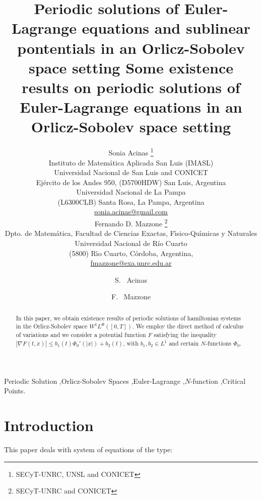 \documentclass[twoside]{elsarticle}
\title{Periodic solutions of 
Euler-Lagrange equations and sublinear pontentials   in an Orlicz-Sobolev space setting }
\author{Sonia Acinas \thanks{SECyT-UNRC, UNSL and CONICET}\\
Instituto de Matem\'atica Aplicada San Luis (IMASL)\\ 
Universidad Nacional de San Luis and CONICET\\
Ej\'ercito de los Andes 950,
(D5700HDW) San Luis, Argentina\\
Universidad Nacional de La Pampa\\
(L6300CLB) Santa Rosa, La Pampa, Argentina\\
\url{sonia.acinas@gmail.com}\\[3mm]
Fernando D. Mazzone \thanks{SECyT-UNRC and CONICET}\\
Dpto. de Matem\'atica, Facultad de Ciencias Exactas, F\'{\i}sico-Qu\'{\i}micas y Naturales\\
Universidad Nacional de R\'{i}o Cuarto\\
(5800) R\'{\i}o Cuarto, C\'ordoba, Argentina,\\
\url{fmazzone@exa.unrc.edu.ar}
}
\date{}
\theoremstyle{remark}
\newcommand{\lphi}{L^{\Phi}}
\newcommand{\wphi}{W^{1}\lphi}
\renewcommand{\leq}{\leqslant}
\begin{document}
\begin{frontmatter}
\title{Some existence results on periodic solutions of 
Euler-Lagrange equations in an Orlicz-Sobolev space setting}



\author[imasl,unlpam]{S. ~Acinas }
\author[unrc,unlpam]{F. ~Mazzone }


\address[imasl]{Instituto de Matem\'atica Aplicada San Luis (CONICET-UNSL),\\
(5700) San Luis, Argentina.  }

\address[unlpam]{Universidad Nacional de La Pampa,
(6300) Santa Rosa, La Pampa, Argentina.  }

\address[unrc]{Dpto. de Matem\'atica, Facultad de Ciencias Exactas, F\'{\i}sico-Qu\'{\i}micas y Naturales,
Universidad Nacional de R\'{i}o Cuarto,
(5800) R\'{\i}o Cuarto, C\'ordoba, Argentina. }




\begin{abstract}




In this paper, we obtain existence results of periodic solutions of hamiltonian systems in the Orlicz-Sobolev space $\wphi([0,T])$.
We employ the direct method of calculus of variations and we consider  a potential  function $F$ satisfying the inequality  
$|\nabla F(t,x)|\leq b_1(t) \Phi_0'(|x|)+b_2(t)$, with  $b_1, b_2\in L^1$ and  certain $N$-functions $\Phi_0$. 
\end{abstract}
\begin{keyword}
Periodic Solution \sep Orlicz-Sobolev Spaces \sep  Euler-Lagrange  \sep $N$-function   \sep Critical Points.   
\end{keyword}

\end{frontmatter}







\section{Introduction}
This paper deals with system  of equations of the type:
\end{document}
